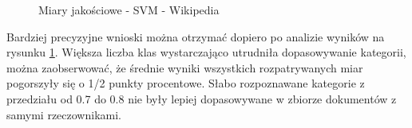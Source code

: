 \begin{figure}[ht!]
	\centering
    \qquad
	\caption{Miary jakościowe - SVM - Wikipedia}
    \label{fig:report-svm-wikipedia}
\end{figure}

Bardziej precyzyjne wnioski można otrzymać dopiero po analizie wyników na rysunku \ref{fig:report-svm-wikipedia}. Większa liczba klas wystarczająco utrudniła dopasowywanie kategorii, można zaobserwować, że średnie wyniki wszystkich rozpatrywanych miar pogorszyły się o 1/2 punkty procentowe. Słabo rozpoznawane kategorie z przedziału od 0.7 do 0.8 nie były lepiej dopasowywane w zbiorze dokumentów z samymi rzeczownikami.   


